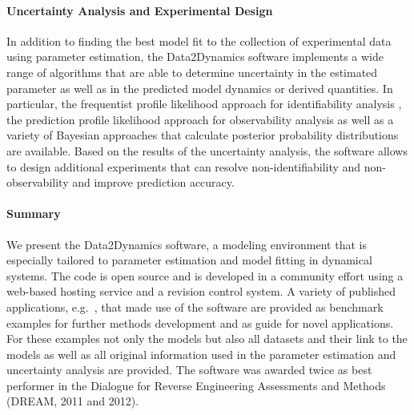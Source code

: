 \documentclass{bioinfo}
\begin{document}
\paragraph{Uncertainty Analysis and Experimental Design}
In addition to finding the best model fit to the collection of experimental data using parameter estimation, the Data2Dynamics software implements a wide range of algorithms that are able to determine uncertainty in the estimated parameter as well as in the predicted model dynamics or derived quantities. In particular, the frequentist profile likelihood approach for identifiability analysis \citep{Raue:2009ec}, the prediction profile likelihood approach for observability analysis \citep{Kreutz:2011kx} as well as a variety of Bayesian approaches \citep{Raue:2013fk, Hug:2012fk} that calculate posterior probability distributions are available. Based on the results of the uncertainty analysis, the software allows to design additional experiments \citep{Steiert:2012fk} that can resolve non-identifiability and non-observability \citep{Raue:2010fk, Kreutz:2013uq} and improve prediction accuracy.


\paragraph{Summary}
We present the Data2Dynamics software, a modeling environment that is especially tailored to parameter estimation and model fitting in dynamical systems. The code is open source and is developed in a community effort using a web-based hosting service and a revision control system. A variety of published applications, e.g.~\citet{Becker:2010hs, Raia:2011vn, Bachmann:2011fk}, that made use of the software are provided as benchmark examples for further methods development and as guide for novel applications. For these examples not only the models but also all datasets and their link to the models as well as all original information used in the parameter estimation and uncertainty analysis are provided. The software was awarded twice as best performer in the Dialogue for Reverse Engineering Assessments and Methods (DREAM, 2011 and 2012).
\end{document}
